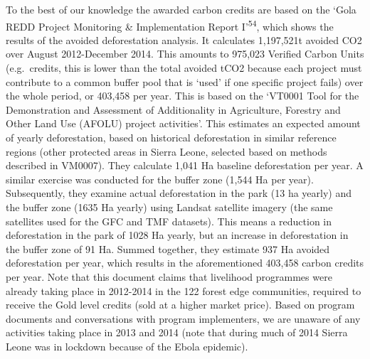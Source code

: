 \documentclass[
]{article}
\begin{document}
To the best of our knowledge the awarded carbon credits are based on the
`Gola REDD Project Monitoring \& Implementation Report
I'\textsuperscript{54}, which shows the results of the avoided
deforestation analysis. It calculates 1,197,521t avoided CO2 over August
2012-December 2014. This amounts to 975,023 Verified Carbon Units
(e.g.~credits, this is lower than the total avoided tCO2 because each
project must contribute to a common buffer pool that is `used' if one
specific project fails) over the whole period, or 403,458 per year. This
is based on the `VT0001 Tool for the Demonstration and Assessment of
Additionality in Agriculture, Forestry and Other Land Use (AFOLU)
project activities'. This estimates an expected amount of yearly
deforestation, based on historical deforestation in similar reference
regions (other protected areas in Sierra Leone, selected based on
methods described in VM0007). They calculate 1,041 Ha baseline
deforestation per year. A similar exercise was conducted for the buffer
zone (1,544 Ha per year). Subsequently, they examine actual
deforestation in the park (13 ha yearly) and the buffer zone (1635 Ha
yearly) using Landsat satellite imagery (the same satellites used for
the GFC and TMF datasets). This means a reduction in deforestation in
the park of 1028 Ha yearly, but an increase in deforestation in the
buffer zone of 91 Ha. Summed together, they estimate 937 Ha avoided
deforestation per year, which results in the aforementioned 403,458
carbon credits per year. Note that this document claims that livelihood
programmes were already taking place in 2012-2014 in the 122 forest edge
communities, required to receive the Gold level credits (sold at a
higher market price). Based on program documents and conversations with
program implementers, we are unaware of any activities taking place in
2013 and 2014 (note that during much of 2014 Sierra Leone was in
lockdown because of the Ebola epidemic).
\end{document}

